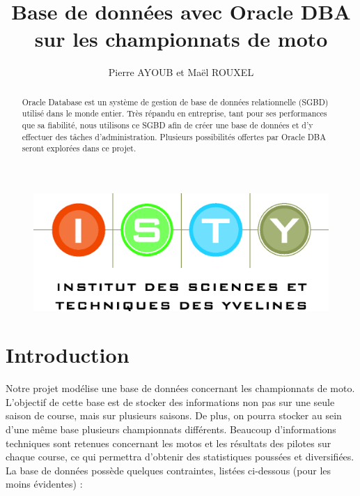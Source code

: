 \documentclass[12pt,a4paper]{article}
\begin{document}
\title{Base de données avec Oracle DBA sur les championnats de moto}
\author{Pierre AYOUB et Maël ROUXEL}

\maketitle

\begin{figure}[b]
    \centering
    \includegraphics[scale=0.3]{figures/isty.jpg}
\end{figure}

\newpage
\begin{abstract}

Oracle Database est un système de gestion de base de données relationnelle
(SGBD) utilisé dans le monde entier. Très répandu en entreprise, tant pour
ses performances que sa fiabilité, nous utilisons ce SGBD afin de créer une
base de données et d’y effectuer des tâches d’administration. Plusieurs
possibilités offertes par Oracle DBA seront explorées dans ce projet.

\end{abstract}

\tableofcontents

\section{Introduction}
\label{sec.intro}

Notre projet modélise une base de données concernant les championnats de moto.
L’objectif de cette base est de stocker des informations non pas sur une seule
saison de course, mais sur plusieurs saisons. De plus, on pourra stocker au sein
d’une même base plusieurs championnats différents. Beaucoup d'informations
techniques sont retenues concernant les motos et les résultats des pilotes sur
chaque course, ce qui permettra d’obtenir des statistiques poussées et
diversifiées. La base de données possède quelques contraintes, listées
ci-dessous (pour les moins évidentes) :
\end{document}
